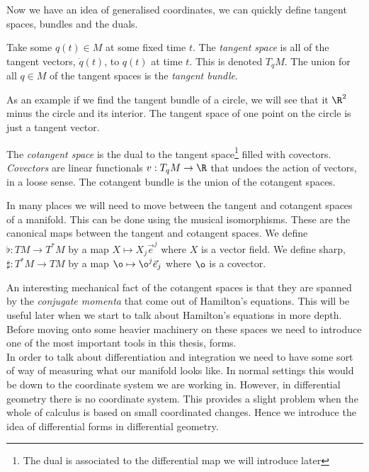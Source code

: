 \noindent
Now we have an idea of generalised coordinates, we can quickly define tangent spaces, bundles and the duals.
\begin{ndefi}
  Take some $q(t) \in M$ at some fixed time $t$. The \textit{tangent space} is all of the tangent vectors, $\dot q(t)$, to $q(t)$ at time $t$. This is denoted $T_qM$. The union for all $q \in M$ of the tangent spaces is the \textit{tangent bundle}.
\end{ndefi}

\noindent
As an example if we find the tangent bundle of a circle, we will see that it $\R^2$ minus the circle and its interior. The tangent space of one point on the circle is just a tangent vector.

\begin{ndefi}
  The \textit{cotangent space} is the dual to the tangent space\footnote{The dual is associated to the differential map we will introduce later} filled with covectors. \textit{Covectors} are linear functionals $v : T_qM \to \R$ that undoes the action of vectors, in a loose sense. The cotangent bundle is the union of the cotangent spaces.
\end{ndefi}

\noindent
In many places we will need to move between the tangent and cotangent spaces of a manifold. This can be done using the musical isomorphisms. These are the canonical maps between the tangent and cotangent spaces. We define $\flat : TM \to T^*M$ by a map $X \mapsto X_j\vec e^j$ where $X$ is a vector field. We define sharp, $\sharp : T^*M \to TM$ by a map $\o \mapsto \o^j\vec e_j$ where $\o$ is a covector.


\noindent
An interesting mechanical fact of the cotangent spaces is that they are spanned by the \textit{conjugate momenta} that come out of Hamilton's equations. This will be useful later when we start to talk about Hamilton's equations in more depth. Before moving onto some heavier machinery on these spaces we need to introduce one of the most important tools in this thesis, forms. \\


\noindent
In order to talk about differentiation and integration we need to have some sort of way of measuring what our manifold looks like. In normal settings this would be down to the coordinate system we are working in. However, in differential geometry there is no coordinate system. This provides a slight problem when the whole of calculus is based on small coordinated changes. Hence we introduce the idea of differential forms in differential geometry. \\

